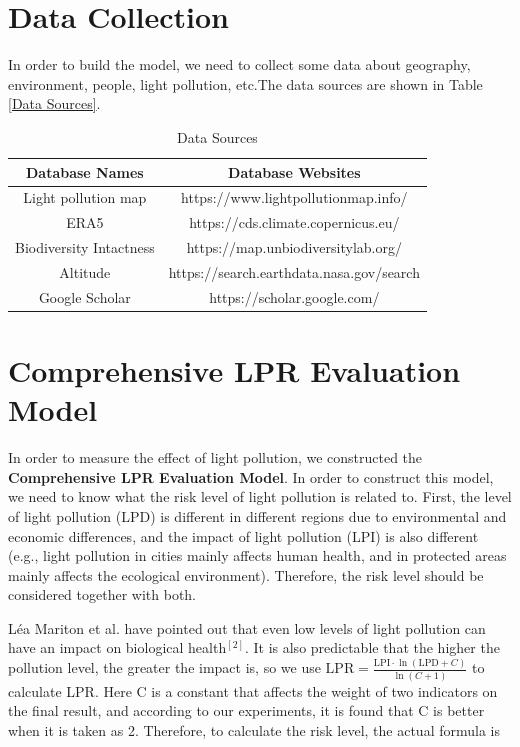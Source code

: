 \documentclass[12pt]{article}
\begin{document}
 \section{Data Collection}
In order to build the model, we need to collect some data about geography, environment, people, light pollution, etc.The data sources are shown in Table \ref{Data Sources}.
\begin{table}[H]
 \begin{center}
  \caption{Data Sources}
  \label{Data Sources}
  \begin{tabular}{cc}
   \toprule
   \multicolumn{1}{m{3cm}}{\centering Database Names}
   &\multicolumn{1}{m{8cm}}{\centering Database Websites}\\
   \midrule
   Light pollution map&https://www.lightpollutionmap.info/\\
   ERA5&https://cds.climate.copernicus.eu/\\
   Biodiversity   Intactness&https://map.unbiodiversitylab.org/\\
   Altitude&https://search.earthdata.nasa.gov/search\\
   Google Scholar&https://scholar.google.com/\\
   \bottomrule
  \end{tabular}\label{Ntt}
 \end{center}
\end{table}

\section{Comprehensive LPR Evaluation Model}
In order to measure the effect of light pollution, we constructed the \textbf{Comprehensive LPR Evaluation Model}. In order to construct this model, we need to know what the risk level of light pollution is related to. First, the level of light pollution (LPD) is different in different regions due to environmental and economic differences, and the impact of light pollution (LPI) is also different (e.g., light pollution in cities mainly affects human health, and in protected areas mainly affects the ecological environment). Therefore, the risk level should be considered together with both.

Léa Mariton et al. have pointed out that even low levels of light pollution can have an impact on biological health$^{[2]}$. It is also predictable that the higher the pollution level, the greater the impact is, so we use
$\text{LPR}=\frac{\text{LPI}\cdot\ln(\text{LPD}+C)}{\ln(C+1)}$
to calculate LPR. Here C is a constant that affects the weight of two indicators on the final result, and according to our experiments, it is found that C is better when it is taken as 2.
Therefore, to calculate the risk level, the actual formula is
\end{document}
